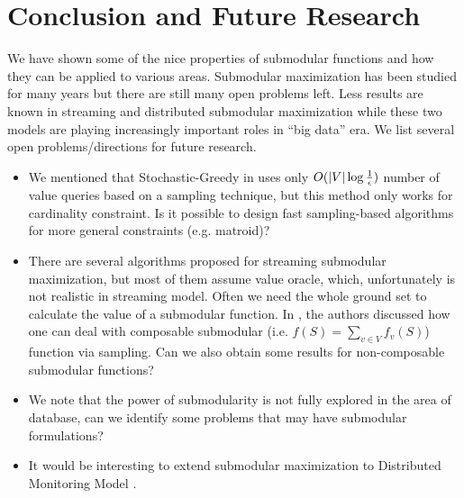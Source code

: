 \section{Conclusion and Future Research}
\label{sec:conclusion}
We have shown some of the nice properties of submodular functions and how they can be applied to various areas. Submodular maximization has been studied for many years but there are still many open problems left. Less results are known in streaming and distributed submodular maximization while these two models are playing increasingly important roles in ``big data'' era. We list several open problems/directions for future research.

\begin{itemize}
\item We mentioned that {\sc Stochastic-Greedy} in \cite{MBK+15} uses only $O(|V|\log\frac{1}{\epsilon})$ number of value queries based on a sampling technique, but this method only works for cardinality constraint. Is it possible to design fast sampling-based algorithms for more general constraints (e.g. matroid)?
\item There are several algorithms proposed for streaming submodular maximization, but most of them assume value oracle, which, unfortunately is not realistic in streaming model. Often we need the whole ground set to calculate the value of a submodular function. In \cite{BMK+14}, the authors discussed how one can deal with composable submodular (i.e. $f(S) = \sum_{v\in V}f_v(S)$) function via sampling. Can we also obtain some results for non-composable submodular functions?
\item We note that the power of submodularity is not fully explored in the area of database, can we identify some problems that may have submodular formulations? 
\item It would be interesting to extend submodular maximization to Distributed Monitoring Model \cite{CMY11}.
\end{itemize}
